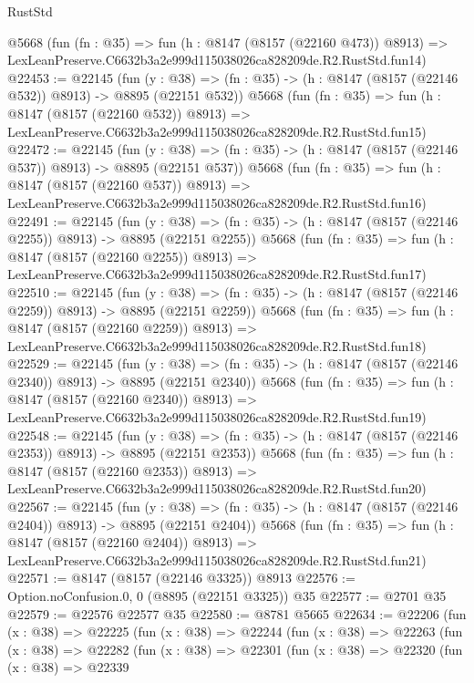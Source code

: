 \begin{lexlean}{RustStd}
\begin{coremodule}
    @5668
    (fun (fn : @35) =>
    fun (h : @8147 (@8157 (@22160 @473)) @8913) =>
    LexLeanPreserve.C6632b3a2e999d115038026ca828209de.R2.RustStd.fun14)
@22453 := @22145
    (fun (y : @38) => (fn : @35) -> (h : @8147 (@8157 (@22146 @532)) @8913) -> @8895 (@22151 @532))
    @5668
    (fun (fn : @35) =>
    fun (h : @8147 (@8157 (@22160 @532)) @8913) =>
    LexLeanPreserve.C6632b3a2e999d115038026ca828209de.R2.RustStd.fun15)
@22472 := @22145
    (fun (y : @38) => (fn : @35) -> (h : @8147 (@8157 (@22146 @537)) @8913) -> @8895 (@22151 @537))
    @5668
    (fun (fn : @35) =>
    fun (h : @8147 (@8157 (@22160 @537)) @8913) =>
    LexLeanPreserve.C6632b3a2e999d115038026ca828209de.R2.RustStd.fun16)
@22491 := @22145
    (fun (y : @38) =>
    (fn : @35) -> (h : @8147 (@8157 (@22146 @2255)) @8913) -> @8895 (@22151 @2255))
    @5668
    (fun (fn : @35) =>
    fun (h : @8147 (@8157 (@22160 @2255)) @8913) =>
    LexLeanPreserve.C6632b3a2e999d115038026ca828209de.R2.RustStd.fun17)
@22510 := @22145
    (fun (y : @38) =>
    (fn : @35) -> (h : @8147 (@8157 (@22146 @2259)) @8913) -> @8895 (@22151 @2259))
    @5668
    (fun (fn : @35) =>
    fun (h : @8147 (@8157 (@22160 @2259)) @8913) =>
    LexLeanPreserve.C6632b3a2e999d115038026ca828209de.R2.RustStd.fun18)
@22529 := @22145
    (fun (y : @38) =>
    (fn : @35) -> (h : @8147 (@8157 (@22146 @2340)) @8913) -> @8895 (@22151 @2340))
    @5668
    (fun (fn : @35) =>
    fun (h : @8147 (@8157 (@22160 @2340)) @8913) =>
    LexLeanPreserve.C6632b3a2e999d115038026ca828209de.R2.RustStd.fun19)
@22548 := @22145
    (fun (y : @38) =>
    (fn : @35) -> (h : @8147 (@8157 (@22146 @2353)) @8913) -> @8895 (@22151 @2353))
    @5668
    (fun (fn : @35) =>
    fun (h : @8147 (@8157 (@22160 @2353)) @8913) =>
    LexLeanPreserve.C6632b3a2e999d115038026ca828209de.R2.RustStd.fun20)
@22567 := @22145
    (fun (y : @38) =>
    (fn : @35) -> (h : @8147 (@8157 (@22146 @2404)) @8913) -> @8895 (@22151 @2404))
    @5668
    (fun (fn : @35) =>
    fun (h : @8147 (@8157 (@22160 @2404)) @8913) =>
    LexLeanPreserve.C6632b3a2e999d115038026ca828209de.R2.RustStd.fun21)
@22571 := @8147 (@8157 (@22146 @3325)) @8913
@22576 := Option.noConfusion.{0, 0} (@8895 (@22151 @3325)) @35
@22577 := @2701 @35
@22579 := @22576 @22577 @35
@22580 := @8781 @5665
@22634 := @22206
    (fun (x : @38) =>
    @22225
      (fun (x : @38) =>
      @22244
        (fun (x : @38) =>
        @22263
          (fun (x : @38) =>
          @22282
            (fun (x : @38) =>
            @22301
              (fun (x : @38) =>
              @22320
                (fun (x : @38) =>
                @22339

\end{coremodule}
\end{lexlean}
